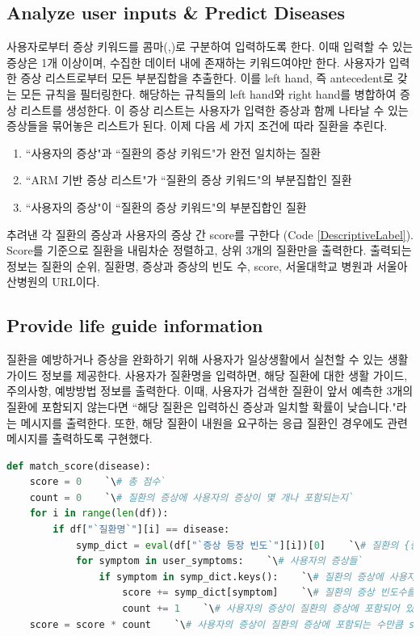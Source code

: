 \documentclass[conference]{IEEEtran}
\begin{document}
\subsection{Analyze user inputs \& Predict Diseases}
사용자로부터 증상 키워드를 콤마(,)로 구분하여 입력하도록 한다. 이때 입력할 수 있는 증상은 1개 이상이며, 수집한 데이터 내에 존재하는 키워드여야만 한다. 사용자가 입력한 증상 리스트로부터 모든 부분집합을 추출한다. 이를 left hand, 즉 antecedent로 갖는 모든 규칙을 필터링한다. 해당하는 규칙들의 left hand와 right hand를 병합하여 증상 리스트를 생성한다. 이 증상 리스트는 사용자가 입력한 증상과 함께 나타날 수 있는 증상들을 묶어놓은 리스트가 된다.
이제 다음 세 가지 조건에 따라 질환을 추린다.
\begin{enumerate}
    \item ``사용자의 증상"과 ``질환의 증상 키워드"가 완전 일치하는 질환
    \item ``ARM 기반 증상 리스트"가 ``질환의 증상 키워드"의 부분집합인 질환
    \item ``사용자의 증상"이 ``질환의 증상 키워드"의 부분집합인 질환
\end{enumerate}
추려낸 각 질환의 증상과 사용자의 증상 간 score를 구한다 (Code \ref{DescriptiveLabel}). Score를 기준으로 질환을 내림차순 정렬하고, 상위 3개의 질환만을 출력한다. 출력되는 정보는 질환의 순위, 질환명, 증상과 증상의 빈도 수, score, 서울대학교 병원과 서울아산병원의 URL이다.

\subsection{Provide life guide information}
질환을 예방하거나 증상을 완화하기 위해 사용자가 일상생활에서 실천할 수 있는 생활 가이드 정보를 제공한다. 사용자가 질환명을 입력하면, 해당 질환에 대한 생활 가이드, 주의사항, 예방방법 정보를 출력한다. 이때, 사용자가 검색한 질환이 앞서 예측한 3개의 질환에 포함되지 않는다면 ``해당 질환은 입력하신 증상과 일치할 확률이 낮습니다."라는 메시지를 출력한다. 또한, 해당 질환이 내원을 요구하는 응급 질환인 경우에도 관련 메시지를 출력하도록 구현했다.

\begin{strip}
\begin{lstlisting}[label=DescriptiveLabel, frame=tb, escapeinside=``, language=Python]
def match_score(disease):
    score = 0    `\# 총 점수`
    count = 0    `\# 질환의 증상에 사용자의 증상이 몇 개나 포함되는지`
    for i in range(len(df)):
        if df["`질환명`"][i] == disease:
            symp_dict = eval(df["`증상 등장 빈도`"][i])[0]    `\# 질환의 {증상: 빈도수} 딕셔너리`
            for symptom in user_symptoms:    `\# 사용자의 증상들`
                if symptom in symp_dict.keys():    `\# 질환의 증상에 사용자의 증상이 있으면`
                    score += symp_dict[symptom]    `\# 질환의 증상 빈도수를 score에 더함`
                    count += 1    `\# 사용자의 증상이 질환의 증상에 포함되어 있으므로 count += 1`
    score = score * count    `\# 사용자의 증상이 질환의 증상에 포함되는 수만큼 score에 곱함`
\end{lstlisting}
\end{strip}
\end{document}
